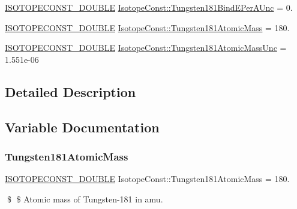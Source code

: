 \begin{DoxyCompactItemize}
\mbox{\hyperlink{group___isotope_const-_macros_ga8f45a7272ce02c0b4c65c44636ed719a}{I\+S\+O\+T\+O\+P\+E\+C\+O\+N\+S\+T\+\_\+\+D\+O\+U\+B\+LE}} \mbox{\hyperlink{group___isotope_const-_tungsten-_w181_gafd1ee7f9ce240315a3fb393315492145}{Isotope\+Const\+::\+Tungsten181\+Bind\+E\+Per\+A\+Unc}} = 0.
\item 
\mbox{\hyperlink{group___isotope_const-_macros_ga8f45a7272ce02c0b4c65c44636ed719a}{I\+S\+O\+T\+O\+P\+E\+C\+O\+N\+S\+T\+\_\+\+D\+O\+U\+B\+LE}} \mbox{\hyperlink{group___isotope_const-_tungsten-_w181_ga92d0d83a18b0b47bf6242a26d5018e68}{Isotope\+Const\+::\+Tungsten181\+Atomic\+Mass}} = 180.
\item 
\mbox{\hyperlink{group___isotope_const-_macros_ga8f45a7272ce02c0b4c65c44636ed719a}{I\+S\+O\+T\+O\+P\+E\+C\+O\+N\+S\+T\+\_\+\+D\+O\+U\+B\+LE}} \mbox{\hyperlink{group___isotope_const-_tungsten-_w181_ga5122bcc41e09f2cda57f8aa8120bb39f}{Isotope\+Const\+::\+Tungsten181\+Atomic\+Mass\+Unc}} = 1.\+551e-\/06
\end{DoxyCompactItemize}


\subsection{Detailed Description}


\subsection{Variable Documentation}
\mbox{\label{group___isotope_const-_tungsten-_w181_ga92d0d83a18b0b47bf6242a26d5018e68}} 
\subsubsection{\texorpdfstring{Tungsten181\+Atomic\+Mass}{Tungsten181AtomicMass}}
{\footnotesize\ttfamily \mbox{\hyperlink{group___isotope_const-_macros_ga8f45a7272ce02c0b4c65c44636ed719a}{I\+S\+O\+T\+O\+P\+E\+C\+O\+N\+S\+T\+\_\+\+D\+O\+U\+B\+LE}} Isotope\+Const\+::\+Tungsten181\+Atomic\+Mass = 180.}

\$ \$ Atomic mass of Tungsten-\/181 in amu. \mbox{\label{group___isotope_const-_tungsten-_w181_ga5122bcc41e09f2cda57f8aa8120bb39f}} 
